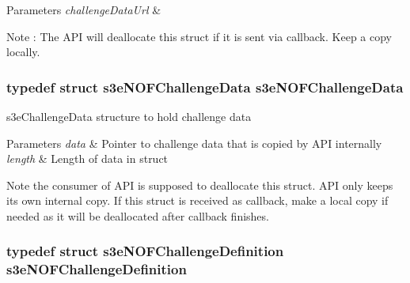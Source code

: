 \begin{DoxyParams}{Parameters}
{\em challengeDataUrl} & \\
\hline
\end{DoxyParams}
\begin{DoxyNote}{Note}
: The API will deallocate this struct if it is sent via callback. Keep a copy locally. 
\end{DoxyNote}
\hypertarget{group___n_open_feint_api_group_ga836b6f1da3311a513c16676c0d6d6107}{
\subsubsection[{s3eNOFChallengeData}]{\setlength{\rightskip}{0pt plus 5cm}typedef struct {\bf s3eNOFChallengeData}  {\bf s3eNOFChallengeData}}}
\label{group___n_open_feint_api_group_ga836b6f1da3311a513c16676c0d6d6107}
s3eChallengeData structure to hold challenge data 
\begin{DoxyParams}{Parameters}
{\em data} & Pointer to challenge data that is copied by API internally \\
\hline
{\em length} & Length of data in struct \\
\hline
\end{DoxyParams}
\begin{DoxyNote}{Note}
the consumer of API is supposed to deallocate this struct. API only keeps its own internal copy. If this struct is received as callback, make a local copy if needed as it will be deallocated after callback finishes. 
\end{DoxyNote}
\hypertarget{group___n_open_feint_api_group_gabc8d488f663fbf90990f7436e14f2161}{
\subsubsection[{s3eNOFChallengeDefinition}]{\setlength{\rightskip}{0pt plus 5cm}typedef struct {\bf s3eNOFChallengeDefinition}  {\bf s3eNOFChallengeDefinition}}}
